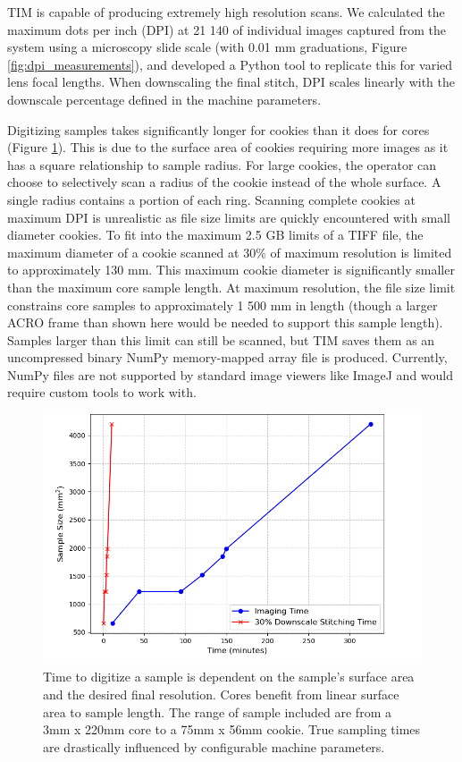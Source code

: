 \documentclass[a4paper,12pt]{article}
\begin{document}
TIM is capable of producing extremely high resolution scans. We calculated the maximum dots per inch (DPI) at 21 140 of individual images captured from the system using a microscopy slide scale (with 0.01 mm graduations, Figure \ref{fig:dpi_measurements}), and developed a Python tool to replicate this for varied lens focal lengths. When downscaling the final stitch, 
DPI scales linearly with the downscale percentage defined in the machine parameters. 

Digitizing samples takes significantly longer for cookies than it does for cores (Figure \ref{fig:digitization_time}). This is due to the surface area of cookies requiring more images as it has a square relationship to sample radius.
For large cookies, the operator can choose to selectively scan a radius of the cookie instead of the whole surface. A single radius contains a portion of each ring. Scanning complete cookies at maximum DPI is unrealistic as file size limits are quickly encountered with small diameter cookies. 
To fit into the maximum 2.5 GB limits of a TIFF file, the maximum diameter of a cookie scanned at 30\% of maximum resolution is limited to approximately 130 mm. This maximum cookie diameter is significantly smaller than the maximum core sample length. At maximum resolution, the file size limit 
constrains core samples to approximately 1 500 mm in length (though a larger ACRO frame than shown here would be needed to support this sample length). Samples larger than this limit can still be scanned, but TIM saves them as an uncompressed binary NumPy memory-mapped array file is produced. Currently, NumPy files are not supported by standard image viewers like ImageJ and would require custom tools to work with. %

\begin{figure}
    \centering
    \includegraphics[height=0.5\linewidth]{../../code/plots/time_and_area.png}
    \caption{Time to digitize a sample is dependent on the sample's surface area and the desired final resolution.
    Cores benefit from linear surface area to sample length. The range of sample included are from a 3mm x 220mm core to a 75mm x 56mm cookie. True sampling times are drastically influenced by configurable machine parameters.} 
    \label{fig:digitization_time}
\end{figure}
\end{document}
